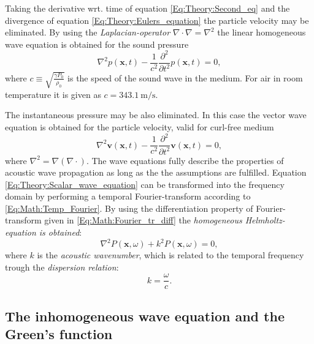 %
Taking the derivative wrt. time of equation \ref{Eq:Theory:Second_eq} and the divergence of equation \ref{Eq:Theory:Eulers_equation} the particle velocity may be eliminated. By using the \emph{Laplacian-operator} $\nabla \cdot \nabla = \nabla^2$ the linear homogeneous wave equation is obtained for the sound pressure
\begin{equation}
\nabla^2 p(\mathbf{x},t) - \frac{1}{c^2} \frac{\partial^2}{\partial t^2} p(\mathbf{x},t) = 0,
\label{Eq:Theory:Scalar_wave_equation}
\end{equation}
%
where $c \equiv \sqrt{ \frac{\gamma P_0}{\rho_0} }$ is the speed of the sound wave in the medium. For air in room temperature it is given as $c = 343.1 ~ \mathrm{m}/\mathrm{s}$.

The instantaneous pressure may be also eliminated. In this case the vector wave equation is obtained for the particle velocity, valid for curl-free medium
\begin{equation}
\nabla^2 \mathbf{v}(\mathbf{x},t) - \frac{1}{c^2} \frac{\partial^2}{\partial t^2} \mathbf{v}(\mathbf{x},t) = 0,
\label{Eq:Theory:Vector_wave_equation}
\end{equation}
where $\nabla^2 = \nabla \left( \nabla \cdot \right)$.
%
The wave equations fully describe the properties of acoustic wave propagation as long as the the assumptions are fulfilled.
%
\vspace{3mm}
%
Equation \eqref{Eq:Theory:Scalar_wave_equation} can be transformed into the frequency domain by performing a temporal Fourier-transform according to \eqref{Eq:Math:Temp_Fourier}. By using the differentiation property of Fourier-transform given in \eqref{Eq:Math:Fourier_tr_diff} the \emph{homogeneous Helmholtz-equation is obtained}:
\begin{equation}
\nabla^2 P(\mathbf{x},\omega) + k^2 P(\mathbf{x},\omega) = 0,
\label{Eq:Theory:Homog_Helmholtz}
\end{equation}
where $k$ is the \emph{acoustic wavenumber}, which is related to the temporal frequency trough the \emph{dispersion relation}:
\begin{equation}
k = \frac{\omega}{c}.
\end{equation}


\newpage
\subsection{The inhomogeneous wave equation and the Green's function}

